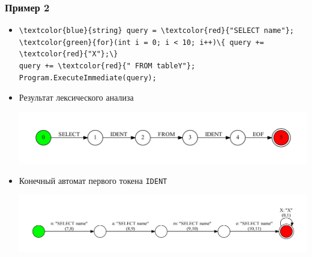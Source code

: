 \documentclass{beamer}
\begin{document}
\begin{frame}[fragile]
\transwipe[direction=90]
\frametitle{Пример 2}
\begin{itemize}
\item \begin{Verbatim}[commandchars=\\\{\}]
\textcolor{blue}{string} query = \textcolor{red}{"SELECT name"};
\textcolor{green}{for}(int i = 0; i < 10; i++)\{ query += \textcolor{red}{"X"};\} 
query += \textcolor{red}{" FROM tableY"};
Program.ExecuteImmediate(query);
\end{Verbatim}

\item Результат лексического анализа 
\begin{center}
   \includegraphics[width=1.0\linewidth]{TokenEx}
\end{center}

\item Конечный автомат первого токена \verb|IDENT|
\begin{center}
   \includegraphics[width=1.0\linewidth]{token}
\end{center}
\end{itemize}
\end{frame}
\end{document}
